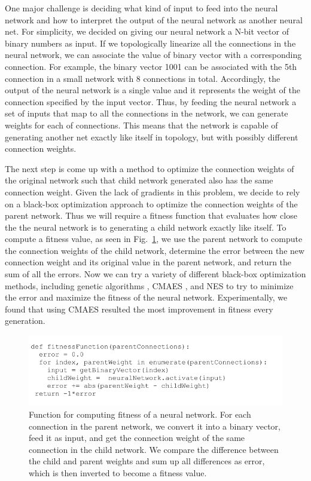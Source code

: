 \documentclass[12pt]{article}
\begin{document}
One major challenge is deciding what kind of input to feed into the neural network and how to interpret the output of the neural network as another neural net. For simplicity, we decided on giving our neural network a N-bit vector of binary numbers as input. If we topologically linearize all the connections in the neural network, we can associate the value of binary vector with a corresponding connection. For example, the binary vector 1001 can be associated with the 5th connection in a small network with 8 connections in total. Accordingly, the output of the neural network is a single value and it represents the weight of the connection specified by the input vector. Thus, by feeding the neural network a set of inputs that map to all the connections in the network, we can generate weights for each of connections. This means that the network is capable of generating another net exactly like itself in topology, but with possibly different connection weights. 

The next step is come up with a method to optimize the connection weights of the original network such that child network generated also has the same connection weight. Given the lack of gradients in this problem, we decide to rely on a black-box optimization approach to optimize the connection weights of the parent network. Thus we will require a fitness function that evaluates how close the the neural network is to generating a child network exactly like itself. To compute a fitness value, as seen in Fig.~\ref{pseudo}, we use the parent network to compute the connection weights of the child network, determine the error between the new connection weight and its original value in the parent network, and return the sum of all the errors. Now we can try a variety of different black-box optimization methods, including genetic algorithms \cite{deb2002fast}, CMAES \cite{hansen2003reducing}, and NES \cite{wierstra2008natural} to try to minimize the error and maximize the fitness of the neural network. Experimentally, we found that using CMAES resulted the most improvement in fitness every generation. 

\begin{figure}[h]
\begin{center}
  \includegraphics[width=0.8\linewidth]{pseudo.png}
\end{center}
   \caption{Function for computing fitness of a neural network. For each connection in the parent network, we convert it into a binary vector, feed it as input, and get the connection weight of the same connection in the child network. We compare the difference between the child and parent weights and sum up all differences as error, which is then inverted to become a fitness value.}
\label{pseudo}
\end{figure} 
\end{document}
